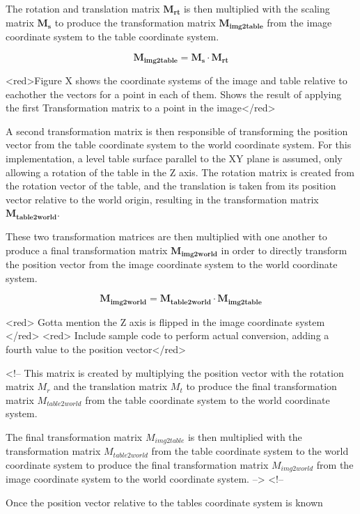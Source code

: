 The rotation and translation matrix $\mathbf{M_{rt}}$ is then multiplied with the scaling matrix $\mathbf{M_s}$ to produce the transformation matrix $\mathbf{M_{img2table}}$ from the image coordinate system to the table coordinate system.

$$\mathbf{M_{img2table}} = \mathbf{M_s} \cdot \mathbf{M_{rt}}$$

<red>Figure X shows the coordinate systems of the image and table relative to eachother the vectors for a point in each of them. Shows the result of applying the first Transformation matrix to a point in the image</red>


A second transformation matrix is then responsible of transforming the position vector from the table coordinate system to the world coordinate system. For this implementation, a level table surface parallel to the XY plane is assumed, only allowing a rotation of the table in the Z axis. The rotation matrix is created from the rotation vector of the table, and the translation is taken from its position vector relative to the world origin, resulting in the transformation matrix $\mathbf{M_{table2world}}$.

These two transformation matrices are then multiplied with one another to produce a final transformation matrix $\mathbf{M_{img2world}}$ in order to directly transform the position vector from the image coordinate system to the world coordinate system.

$$\mathbf{M_{img2world}} = \mathbf{M_{table2world}} \cdot \mathbf{M_{img2table}}$$



<red> Gotta mention the Z axis is flipped in the image coordinate system </red>
<red> Include sample code to perform actual conversion, adding a fourth value to the position vector</red>

<!-- 
 This matrix is created by multiplying the position vector with the rotation matrix $M_r$ and the translation matrix $M_t$ to produce the final transformation matrix $M_{table2world}$ from the table coordinate system to the world coordinate system.


The final transformation matrix $M_{img2table}$ is then multiplied with the transformation matrix $M_{table2world}$ from the table coordinate system to the world coordinate system to produce the final transformation matrix $M_{img2world}$ from the image coordinate system to the world coordinate system.
 -->
<!-- 

Once the position vector relative to the tables coordinate system is known

